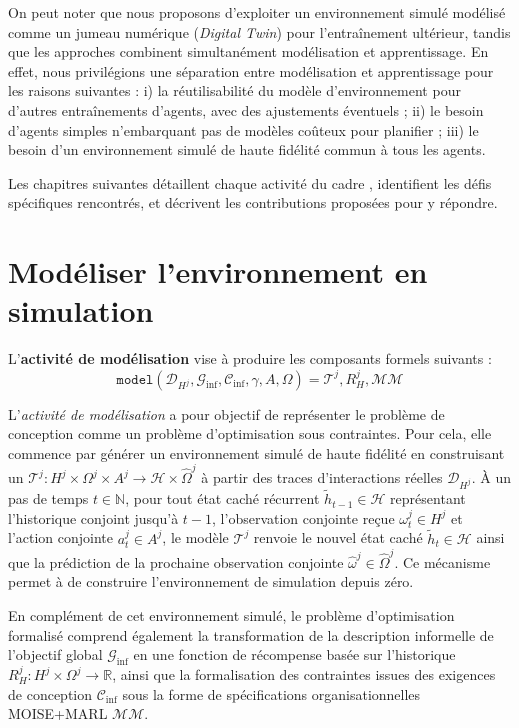 \noindent On peut noter que nous proposons d'exploiter un environnement simulé modélisé comme un jumeau numérique (\textit{Digital Twin}) pour l'entraînement ultérieur, tandis que les approches  combinent simultanément modélisation et apprentissage. En effet, nous privilégions une séparation entre modélisation et apprentissage pour les raisons suivantes : i) la réutilisabilité du modèle d'environnement pour d'autres entraînements d'agents, avec des ajustements éventuels ; \quad ii) le besoin d'agents simples n'embarquant pas de modèles coûteux pour planifier ; \quad iii) le besoin d'un environnement simulé de haute fidélité commun à tous les agents.

\noindent Les chapitres suivantes détaillent chaque activité du cadre , identifient les défis spécifiques rencontrés, et décrivent les contributions proposées pour y répondre.


\chapter{Modéliser l'environnement en simulation}
\label{chap:modelling}

L'\textbf{activité de modélisation} vise à produire les composants formels suivants :
\begin{displaymath}
    \texttt{model}(\mathcal{D}_{H^j}, \mathcal{G}_{\text{inf}}, \mathcal{C}_{\text{inf}}, \gamma, A, \Omega) = \mathcal{T}^j, R^j_H, \mathcal{MM}
\end{displaymath}

\noindent L'\textit{activité de modélisation} a pour objectif de représenter le problème de conception comme un problème d'optimisation sous contraintes. Pour cela, elle commence par générer un environnement simulé de haute fidélité en construisant un  $\mathcal{T}^j : H^j \times \Omega^j \times A^j \rightarrow \mathcal{H} \times \hat{\Omega}^j$ à partir des traces d'interactions réelles $\mathcal{D}_{H^j}$. À un pas de temps $t \in \mathbb{N}$, pour tout état caché récurrent $\tilde{h}_{t-1} \in \mathcal{H}$ représentant l'historique conjoint jusqu'à $t-1$, l'observation conjointe reçue $\omega_t^j \in H^j$ et l'action conjointe $a_t^j \in A^j$, le modèle $\mathcal{T}^j$ renvoie le nouvel état caché $\tilde{h}_t \in \mathcal{H}$ ainsi que la prédiction de la prochaine observation conjointe $\hat{\omega}^j \in \hat{\Omega}^j$. Ce mécanisme permet à  de construire l'environnement de simulation depuis zéro.

En complément de cet environnement simulé, le problème d'optimisation formalisé comprend également la transformation de la description informelle de l'objectif global $\mathcal{G}_{\text{inf}}$ en une fonction de récompense basée sur l'historique $R^j_H: H^j \times \Omega^j \rightarrow \mathbb{R}$, ainsi que la formalisation des contraintes issues des exigences de conception $\mathcal{C}_{\text{inf}}$ sous la forme de spécifications organisationnelles MOISE+MARL $\mathcal{MM}$.

